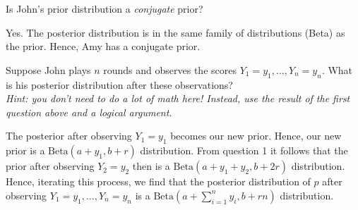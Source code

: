 \begin{exercise}[1]
Is John's prior distribution a \textit{conjugate} prior?
\begin{solution}
Yes. The posterior distribution is in the same family of distributions (Beta) as the prior. Hence, Amy has a conjugate prior.
\end{solution}
\end{exercise}

\begin{exercise}[1.5]
Suppose John plays $n$ rounds and observes the scores $Y_1 = y_1, \ldots, Y_n = y_n$. What is his posterior distribution after these observations? \\
\textit{Hint: you don't need to do a lot of math here! Instead, use the result of the first question above and a logical argument.}
\begin{solution}
The posterior after observing $Y_1 = y_1$ becomes our new prior. Hence, our new prior is a $\text{Beta}(a+y_1,b+r)$ distribution. From question 1 it follows that the prior after observing $Y_2 = y_2$ then is a $\text{Beta}(a+y_1 + y_2,b+ 2r)$ distribution. Hence, iterating this process, we find that the posterior distribution of $p$ after observing $Y_1 = y_1, \ldots, Y_n = y_n$ is a $\text{Beta}(a+\sum_{i=1}^n y_i,b+ rn)$ distribution.
\end{solution}
\end{exercise}